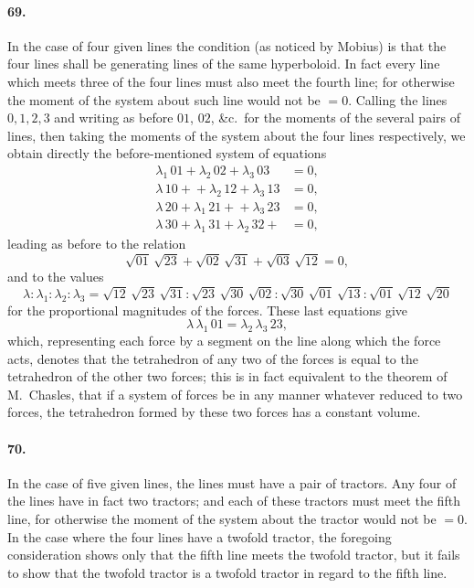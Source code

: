 \documentclass[11pt,a4paper]{article}
\begin{document}
\paragraph{69.}
In the case of four given lines the condition (as noticed by Mobius) is that
the four lines shall be generating lines of the same hyperboloid. In fact every line
which meets three of the four lines must also meet the fourth line; for otherwise
the moment of the system about such line would not be $= 0$. Calling the lines
$0, 1, 2, 3$ and writing as before $01$, $02$, \&c.\ for the moments of the several pairs of
lines, then taking the moments of the system about the four lines respectively, we
obtain directly the before-mentioned system of equations
\begin{align*}
\lambda_1\,01 + \lambda_2\,02 + \lambda_3\,03 &= 0, \\
\lambda\,10 + {} + \lambda_2\,12 + \lambda_3\,13 &= 0, \\
\lambda\,20 + \lambda_1\,21 + {} + \lambda_3\,23 &= 0, \\
\lambda\,30 + \lambda_1\,31 + \lambda_2\,32 + {} &= 0,
\end{align*}
leading as before to the relation
\[
\sqrt{01}\,\sqrt{23} + \sqrt{02}\,\sqrt{31} + \sqrt{03}\,\sqrt{12} = 0,
\]
and to the values
\[
\lambda : \lambda_1 : \lambda_2 : \lambda_3
 = \sqrt{12}\,\sqrt{23}\,\sqrt{31}
 : \sqrt{23}\,\sqrt{30}\,\sqrt{02}
 : \sqrt{30}\,\sqrt{01}\,\sqrt{13}
 : \sqrt{01}\,\sqrt{12}\,\sqrt{20}
\]
for the proportional magnitudes of the forces. These last equations give
\[
\lambda\,\lambda_1\,01 = \lambda_2\,\lambda_3\,23,
\]
which, representing each force by a segment on the line along which the force acts,
denotes that the tetrahedron of any two of the forces is equal to the tetrahedron of
the other two forces; this is in fact equivalent to the theorem of M.\ Chasles, that
if a system of forces be in any manner whatever reduced to two forces, the
tetrahedron formed by these two forces has a constant volume.

\paragraph{70.}
In the case of five given lines, the lines must have a pair of tractors. Any
four of the lines have in fact two tractors; and each of these tractors must meet
the fifth line, for otherwise the moment of the system about the tractor would not
be $= 0$. In the case where the four lines have a twofold tractor, the foregoing
consideration shows only that the fifth line meets the twofold tractor, but it fails to
show that the twofold tractor is a twofold tractor in regard to the fifth line.
\end{document}
